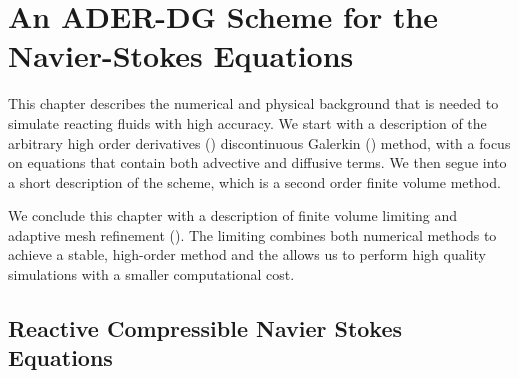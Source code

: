 \chapter{An ADER-DG Scheme for the Navier-Stokes Equations}\label{chap:methods}
This chapter describes the numerical and physical background that is needed to simulate reacting fluids with high accuracy.
We start with a description of the arbitrary high order derivatives (\ader{}) discontinuous Galerkin (\dg{}) method, with a focus on equations that contain both advective and diffusive terms.
We then segue into a short description of the \muscl{} scheme, which is a second order finite volume method.

We conclude this chapter with a description of finite volume limiting and adaptive mesh refinement (\amr{}).
The limiting combines both numerical methods to achieve a stable, high-order method and the \amr{} allows us to perform high quality simulations with a smaller computational cost.
\section{Reactive Compressible Navier Stokes Equations}\label{sec:navier-stokes}
\newcommand{\diffCoeff}{\varepsilon}
\newcommand{\hyperFluxDef}{
  \begin{pmatrix}
    \Qj \\
    \Qv  \otimes \Qj + \bm{I} \pressure  \\
    \Qv \cdot (\bm{I} \QE + \bm{I} \pressure) \\
    \Qj \QZZ
  \end{pmatrix}
}
\newcommand{\viscFluxDef}{
  \begin{pmatrix}
    0\\
     \stressT (\Q, \gradQ)  \\
     \Qv \cdot \stressT (\Q, \gradQ) - \kappa \gradient{T}\\
     0\\
   \end{pmatrix}
}

